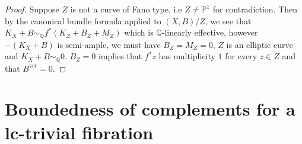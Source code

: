 \documentclass[letterpaper,reqno,12pt]{amsart}
\numberwithin{equation}{section}
\theoremstyle{plain}
\begin{document}
\begin{proof}
    Suppose $Z$ is not a curve of Fano type, i.e $Z\neq \mathbb P^1$ for contradiction. Then by the canonical bundle formula applied to $(X,B)/Z$, we see that $K_X+B\sim_\mathbb Qf^*(K_Z+B_Z+M_Z)$ which is $\mathbb Q$-linearly effective, however $-(K_X+B)$ is semi-ample, we must have $B_Z=M_Z=0$, $Z$ is an elliptic curve and $K_X+B\sim_\mathbb Q0$. $B_Z=0$ implies that $f^*z$ has multiplicity $1$ for every $z\in Z$ and that $B^\text{ver}=0$.
\end{proof}

\section{Boundedness of complements for a lc-trivial fibration}
\end{document}
